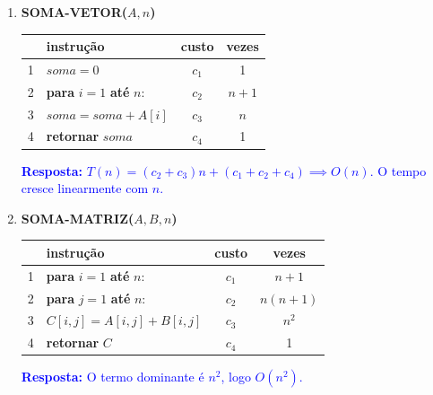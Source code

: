 \documentclass[12pt]{article}
\newcommand{\resposta}[1]{\textcolor{blue}{\textbf{Resposta:} #1}}
\begin{document}
\begin{enumerate}[label=\arabic*), leftmargin=1.5cm, itemsep=1cm]

    \item \textbf{SOMA-VETOR($A, n$)} \\
    \begin{tcolorbox}[colback=white, colframe=black, fontupper=\small]
        \begin{tabular}{llcc}
            \hline
            & \textbf{instrução} & \textbf{custo} & \textbf{vezes} \\
            \hline
            1 & $soma = 0$ & $c_1$ & 1 \\
            2 & \textbf{para} $i = 1$ \textbf{até} $n$: & $c_2$ & $n+1$ \\
            3 & \quad $soma = soma + A[i]$ & $c_3$ & $n$ \\
            4 & \textbf{retornar} $soma$ & $c_4$ & 1 \\
            \hline
        \end{tabular}
    \end{tcolorbox}
    \resposta{$T(n) = (c_2+c_3)n + (c_1+c_2+c_4) \implies O(n)$. O tempo cresce linearmente com $n$.}

    \item \textbf{SOMA-MATRIZ($A, B, n$)} \\
    \begin{tcolorbox}[colback=white, colframe=black, fontupper=\small]
        \begin{tabular}{llcc}
            \hline
            & \textbf{instrução} & \textbf{custo} & \textbf{vezes} \\
            \hline
            1 & \textbf{para} $i = 1$ \textbf{até} $n$: & $c_1$ & $n+1$ \\
            2 & \quad \textbf{para} $j = 1$ \textbf{até} $n$: & $c_2$ & $n(n+1)$ \\
            3 & \quad \quad $C[i,j] = A[i,j] + B[i,j]$ & $c_3$ & $n^2$ \\
            4 & \textbf{retornar} $C$ & $c_4$ & 1 \\
            \hline
        \end{tabular}
    \end{tcolorbox}
    \resposta{O termo dominante é $n^2$, logo $O(n^2)$.}


\end{enumerate}
\end{document}

